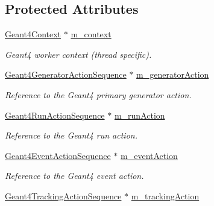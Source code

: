 \subsection*{Protected Attributes}
\begin{DoxyCompactItemize}
\item 
\hyperlink{class_d_d4hep_1_1_simulation_1_1_geant4_context}{Geant4Context} $\ast$ \hyperlink{class_d_d4hep_1_1_simulation_1_1_geant4_action_container_a72ed1f7c3f20c13479de89ebdfd10e77}{m\_\-context}
\begin{DoxyCompactList}\small\item\em Geant4 worker context (thread specific). \item\end{DoxyCompactList}\item 
\hyperlink{class_d_d4hep_1_1_simulation_1_1_geant4_generator_action_sequence}{Geant4GeneratorActionSequence} $\ast$ \hyperlink{class_d_d4hep_1_1_simulation_1_1_geant4_action_container_acbb02aa950b5dc79ca78448a5ff23994}{m\_\-generatorAction}
\begin{DoxyCompactList}\small\item\em Reference to the Geant4 primary generator action. \item\end{DoxyCompactList}\item 
\hyperlink{class_d_d4hep_1_1_simulation_1_1_geant4_run_action_sequence}{Geant4RunActionSequence} $\ast$ \hyperlink{class_d_d4hep_1_1_simulation_1_1_geant4_action_container_a627339c1dc5e85a432170b010abd3505}{m\_\-runAction}
\begin{DoxyCompactList}\small\item\em Reference to the Geant4 run action. \item\end{DoxyCompactList}\item 
\hyperlink{class_d_d4hep_1_1_simulation_1_1_geant4_event_action_sequence}{Geant4EventActionSequence} $\ast$ \hyperlink{class_d_d4hep_1_1_simulation_1_1_geant4_action_container_aa97d07df82c52404b5211277bca15a40}{m\_\-eventAction}
\begin{DoxyCompactList}\small\item\em Reference to the Geant4 event action. \item\end{DoxyCompactList}\item 
\hyperlink{class_d_d4hep_1_1_simulation_1_1_geant4_tracking_action_sequence}{Geant4TrackingActionSequence} $\ast$ \hyperlink{class_d_d4hep_1_1_simulation_1_1_geant4_action_container_a5a39104d6cb2d3d0c578ddb50fbb988b}{m\_\-trackingAction}

\end{DoxyCompactItemize}
